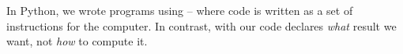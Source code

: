 In Python, we wrote programs using  -- where
code is written as a set of instructions for the computer.  In contrast, with
 our code declares \emph{what} result we want,
not \emph{how} to compute it. 

\\
